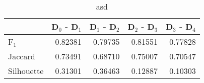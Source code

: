 \begin{table}
\centering
\caption{asd}
\label{tab:s1-orig-splitmerge-combined}
\begin{tabular}{lrrrr}
\toprule
{} &  D$_0$ - D$_1$ &  D$_1$ - D$_2$ &  D$_2$ - D$_3$ &  D$_3$ - D$_4$ \\
\midrule
F$_1$      &        0.82381 &        0.79735 &        0.81551 &        0.77828 \\
Jaccard    &        0.73491 &        0.68710 &        0.75007 &        0.70547 \\
Silhouette &        0.31301 &        0.36463 &        0.12887 &        0.10303 \\
\bottomrule
\end{tabular}
\end{table}
